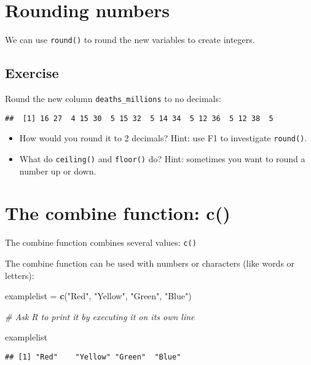 \documentclass[]{book}
\makeatletter
\newenvironment{Shaded}{\begin{snugshade}}{\end{snugshade}}
\newcommand{\KeywordTok}[1]{\textcolor[rgb]{0.13,0.29,0.53}{\textbf{#1}}}
\newcommand{\StringTok}[1]{\textcolor[rgb]{0.31,0.60,0.02}{#1}}
\newcommand{\CommentTok}[1]{\textcolor[rgb]{0.56,0.35,0.01}{\textit{#1}}}
\newcommand{\NormalTok}[1]{#1}
\newenvironment{kframe}{%
\medskip{}
\setlength{\fboxsep}{.8em}
 \def\at@end@of@kframe{}%
 \ifinner\ifhmode%
  \def\at@end@of@kframe{\end{minipage}}%
  \begin{minipage}{\columnwidth}%
 \fi\fi%
 \def\FrameCommand##1{\hskip\@totalleftmargin \hskip-\fboxsep
 \colorbox{shadecolor}{##1}\hskip-\fboxsep
     \hskip-\linewidth \hskip-\@totalleftmargin \hskip\columnwidth}%
 \MakeFramed {\advance\hsize-\width
   \@totalleftmargin\z@ \linewidth\hsize
   \@setminipage}}%
 {\par\unskip\endMakeFramed%
 \at@end@of@kframe}
\renewenvironment{Shaded}{\begin{kframe}}{\end{kframe}}
\theoremstyle{definition}
\theoremstyle{definition}
\theoremstyle{definition}
\theoremstyle{remark}
\makeatother
\begin{document}
\section{Rounding numbers}\label{rounding-numbers}

We can use \texttt{round()} to round the new variables to create
integers.

\subsection{Exercise}\label{exercise-10}

Round the new column \texttt{deaths\_millions} to no decimals:

\begin{verbatim}
##  [1] 16 27  4 15 30  5 15 32  5 14 34  5 12 36  5 12 38  5
\end{verbatim}

\begin{itemize}
\item
  How would you round it to 2 decimals? Hint: use F1 to investigate
  \texttt{round()}.
\item
  What do \texttt{ceiling()} and \texttt{floor()} do? Hint: sometimes
  you want to round a number up or down.
\end{itemize}

\section{The combine function: c()}\label{the-combine-function-c}

The combine function combines several values: \texttt{c()}

The combine function can be used with numbers or characters (like words
or letters):

\begin{Shaded}
\begin{Highlighting}[]
\NormalTok{examplelist =}\StringTok{ }\KeywordTok{c}\NormalTok{(}\StringTok{"Red"}\NormalTok{, }\StringTok{"Yellow"}\NormalTok{, }\StringTok{"Green"}\NormalTok{, }\StringTok{"Blue"}\NormalTok{)}

\CommentTok{# Ask R to print it by executing it on its own line}

\NormalTok{examplelist}
\end{Highlighting}
\end{Shaded}

\begin{verbatim}
## [1] "Red"    "Yellow" "Green"  "Blue"
\end{verbatim}
\end{document}
